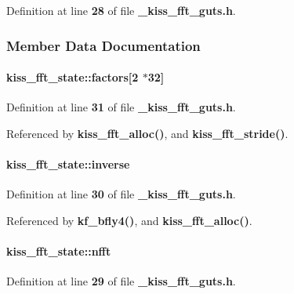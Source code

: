 Definition at line {\bf 28} of file {\bf \+\_\+kiss\+\_\+fft\+\_\+guts.\+h}.



\subsubsection{Member Data Documentation}
\paragraph[{factors}]{ kiss\+\_\+fft\+\_\+state\+::factors[2 $\ast$32]}\label{structkiss__fft__state_a3a06b2b75e284bd511607ed1a91adcbf}


Definition at line {\bf 31} of file {\bf \+\_\+kiss\+\_\+fft\+\_\+guts.\+h}.



Referenced by {\bf kiss\+\_\+fft\+\_\+alloc()}, and {\bf kiss\+\_\+fft\+\_\+stride()}.

\paragraph[{inverse}]{ kiss\+\_\+fft\+\_\+state\+::inverse}\label{structkiss__fft__state_a8faed935610ffb08bf7ad9ea8d6c81d2}


Definition at line {\bf 30} of file {\bf \+\_\+kiss\+\_\+fft\+\_\+guts.\+h}.



Referenced by {\bf kf\+\_\+bfly4()}, and {\bf kiss\+\_\+fft\+\_\+alloc()}.

\paragraph[{nfft}]{ kiss\+\_\+fft\+\_\+state\+::nfft}\label{structkiss__fft__state_aa7446bded329a40e13aef0826e349791}


Definition at line {\bf 29} of file {\bf \+\_\+kiss\+\_\+fft\+\_\+guts.\+h}.



